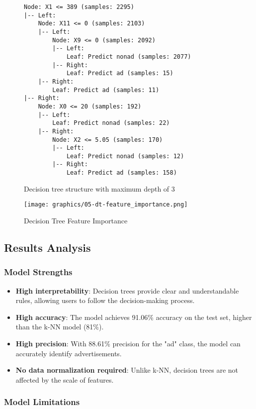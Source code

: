 \begin{figure}[h]
\centering
\begin{verbatim}
Node: X1 <= 389 (samples: 2295)
|-- Left:
    Node: X11 <= 0 (samples: 2103)
    |-- Left:
        Node: X9 <= 0 (samples: 2092)
        |-- Left:
            Leaf: Predict nonad (samples: 2077)
        |-- Right:
            Leaf: Predict ad (samples: 15)
    |-- Right:
        Leaf: Predict ad (samples: 11)
|-- Right:
    Node: X0 <= 20 (samples: 192)
    |-- Left:
        Leaf: Predict nonad (samples: 22)
    |-- Right:
        Node: X2 <= 5.05 (samples: 170)
        |-- Left:
            Leaf: Predict nonad (samples: 12)
        |-- Right:
            Leaf: Predict ad (samples: 158)
\end{verbatim}
\caption{Decision tree structure with maximum depth of 3}
\end{figure}

\begin{figure}[h]
\centering
\texttt{[image: graphics/05-dt-feature\_importance.png]}
\caption{Decision Tree Feature Importance}
\end{figure}

\subsection{Results Analysis}

\subsubsection{Model Strengths}

\begin{itemize}
    \item \textbf{High interpretability}: Decision trees provide clear and understandable rules, allowing users to follow the decision-making process.
    \item \textbf{High accuracy}: The model achieves 91.06\% accuracy on the test set, higher than the k-NN model (81\%).
    \item \textbf{High precision}: With 88.61\% precision for the "ad" class, the model can accurately identify advertisements.
    \item \textbf{No data normalization required}: Unlike k-NN, decision trees are not affected by the scale of features.
\end{itemize}

\subsubsection{Model Limitations}

